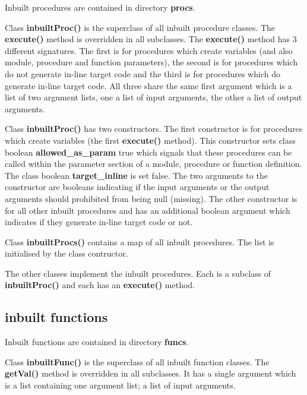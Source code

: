 \documentclass[10pt,a4paper,twoside,fleqn]{book}
\begin{document}
            Inbuilt procedures are contained in directory {\bf procs}.

            Class {\bf inbuiltProc()} is the superclass of all inbuilt procedure
            classes. The {\bf execute()} method is overridden in all subclasses.
            The {\bf execute()} method has 3 different signatures. The first is
            for procedures which create variables (and also module, procedure and
            function parameters), the second is for procedures which do not
            generate in-line target code and the third is for procedures which do
            generate in-line target code. All three share the same first argument
            which is a list of two argument lists, one a list
            of input arguments, the other a list of output arguments.

            Class {\bf inbuiltProc()} has two constructors. The first constructor is
            for procedures which create variables (the first {\bf execute()}
            method). This constructor sets class boolean {\bf allowed\_as\_param} true
            which signals that these procedures can be called within the parameter
            section of a module, procedure or function definition. The class boolean
            {\bf target\_inline} is set false. The two arguments to the constructor
            are booleans indicating if the input arguments or the output arguments
            should prohibited from being null (missing). The other constructor is
            for all other inbuilt procedures and has an additional boolean argument
            which indicates if they generate in-line target code or not.

            Class {\bf inbuiltProcs()} contains a map of all inbuilt procedures. The
            list is initialised by the class contructor.

            The other classes implement the inbuilt procedures. Each is a subclass
            of {\bf inbuiltProc()} and each has an {\bf execute()} method.

        \subsection{inbuilt functions}

            Inbuilt functions are contained in directory {\bf funcs}.

            Class {\bf inbuiltFunc()} is the superclass of all inbuilt function
            classes. The {\bf getVal()} method is overridden in all subclasses. It
            has a single argument which is a list containing one argument list; a
            list of input arguments.
\end{document}
